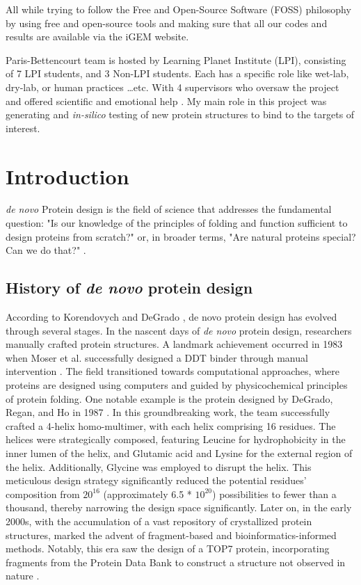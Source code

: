 \documentclass[11pt,a4paper]{article}
\begin{document}
All while trying to follow the Free and Open-Source Software (FOSS) philosophy \cite{gun_foss} by using free and open-source tools and making sure that all our codes and results are available via the iGEM website.

Paris-Bettencourt team is hosted by Learning Planet Institute (LPI),
consisting of 7 LPI students, and 3 Non-LPI students.
Each has a specific role like wet-lab, dry-lab, or human practices \ldots etc. With 4 supervisors who oversaw the project and offered scientific and emotional help \cite{paris_bettencourt_team}.
My main role in this project was generating and \emph{in-silico} testing of new protein structures to bind to the targets of interest.


\section{Introduction}

\emph{de novo} Protein design is the field of science that addresses the 
fundamental question: "Is our knowledge of the principles of folding 
and function sufficient to design proteins from scratch?" 
\cite{korendovych2020novo} or, in broader terms, "Are natural proteins 
special? Can we do that?" \cite{hecht2018natural}.

\subsection{History of \emph{de novo} protein design}

According to Korendovych and DeGrado \cite{korendovych2020novo}, de 
novo protein design has evolved through several stages.
In the nascent days of \emph{de novo} protein design, researchers manually 
crafted protein structures. A landmark achievement occurred in 1983 
when Moser et al. successfully designed a DDT binder through manual 
intervention \cite{moser1983artificial}.
The field transitioned towards computational approaches, where proteins 
are designed using computers and guided by physicochemical principles 
of protein folding. One notable example is the protein designed by 
DeGrado, Regan, and Ho in 1987 \cite{degrado1987design}. In this 
groundbreaking work, the team successfully crafted a 4-helix 
homo-multimer, with each helix comprising 16 residues. The helices were 
strategically composed, featuring Leucine for hydrophobicity in the 
inner lumen of the helix, and Glutamic acid and Lysine for the external 
region of the helix. Additionally, Glycine was employed to disrupt the 
helix. This meticulous design strategy significantly reduced the 
potential residues' composition from $20^{16}$ (approximately 6.5 * $10^
{20}$) possibilities to fewer than a thousand, thereby narrowing the 
design space significantly. 
Later on, in the early 2000s, with the accumulation of a vast repository 
of crystallized protein structures,  marked the advent of 
fragment-based and bioinformatics-informed methods. Notably, this era 
saw the design of a  TOP7 protein, incorporating fragments from the 
Protein Data Bank to construct a structure not observed in nature \cite
{kuhlman2003design}.
\end{document}
